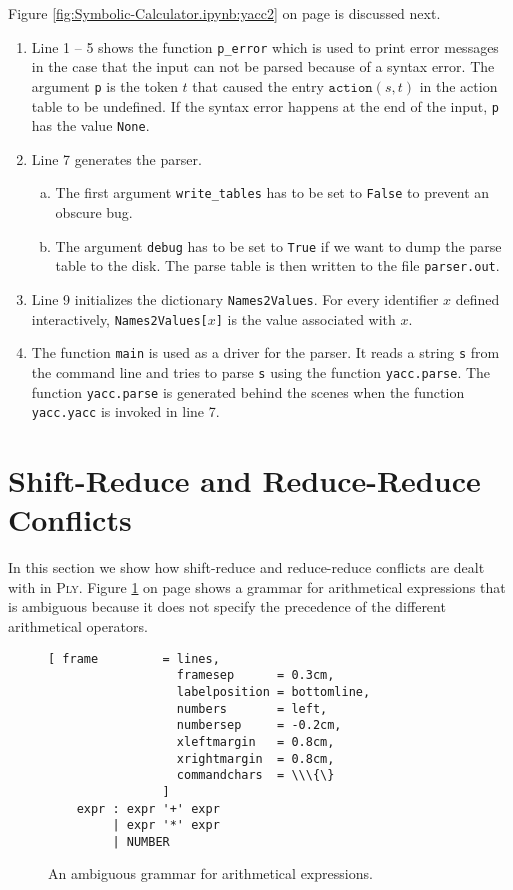 \noindent
Figure \ref{fig:Symbolic-Calculator.ipynb:yacc2} on page \pageref{fig:Symbolic-Calculator.ipynb:yacc2}
is discussed next.
\begin{enumerate}
\item Line 1 -- 5 shows the function \texttt{p\_error} which is used to print error messages in the case that
      the input can not be parsed because of a syntax error.  The argument \texttt{p} is the token $t$ that
      caused the entry $\texttt{action}(s, t)$ in the action table to be undefined.
      If the syntax error happens at the end of the input, \texttt{p} has the value \texttt{None}.
\item Line 7 generates the parser.
      \begin{enumerate}[(a)]
      \item The first argument \texttt{write\_tables} has to be set to \texttt{False} to prevent an obscure bug.
      \item The argument \texttt{debug} has to be set to \texttt{True} if we want to dump the parse table
            to the disk.  The parse table is then written to the file \texttt{parser.out}.
      \end{enumerate}
\item Line 9 initializes the dictionary \texttt{Names2Values}.  For every identifier $x$ defined interactively,
      \texttt{Names2Values[$x$]} is the value associated with $x$.
\item The function \texttt{main} is used as a driver for the parser.  It reads a string \texttt{s}
      from the command line and tries to parse \texttt{s} using the function \texttt{yacc.parse}.
      The function \texttt{yacc.parse} is generated behind the scenes when the function \texttt{yacc.yacc} is
      invoked in line 7. 
\end{enumerate}


\section{Shift-Reduce and Reduce-Reduce Conflicts}
In this section we show how shift-reduce and reduce-reduce conflicts are dealt with in \textsc{Ply}.
Figure \ref{fig:Conflicts.ipynb} on page \pageref{fig:Conflicts.ipynb} shows a grammar for arithmetical
expressions that is ambiguous because it does not specify the precedence of the different arithmetical
operators.  


\begin{figure}[!ht]
\centering
\begin{Verbatim}[ frame         = lines, 
                  framesep      = 0.3cm, 
                  labelposition = bottomline,
                  numbers       = left,
                  numbersep     = -0.2cm,
                  xleftmargin   = 0.8cm,
                  xrightmargin  = 0.8cm,
                  commandchars  = \\\{\}
                ]
    expr : expr '+' expr
         | expr '*' expr
         | NUMBER      
\end{Verbatim}
\vspace*{-0.3cm}
\caption{An ambiguous grammar for arithmetical expressions.}
\label{fig:Conflicts.ipynb}
\end{figure}
\FloatBarrier

